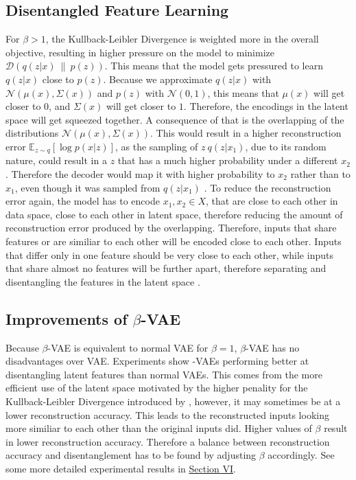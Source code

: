 \documentclass[a4paper]{IEEEtran}
\begin{document}
\subsection{Disentangled Feature Learning}
For $\beta > 1$, the Kullback-Leibler Divergence is weighted more in the overall objective, resulting in higher pressure on the model to minimize $\mathcal{D}(q(z|x) \ \| \ p(z))$. This means that the model gets pressured to learn $q(z|x)$ close to $p(z)$. Because we approximate $q(z|x)$ with $\mathcal{N}(\mu(x), \Sigma(x))$ and $p(z)$ with $\mathcal{N}(0, 1)$, this means that $\mu(x)$ will get closer to $0$, and $\Sigma(x)$ will get closer to $1$. Therefore, the encodings in the latent space will get squeezed together. A consequence of that is the overlapping of the distributions $\mathcal{N}(\mu(x), \Sigma(x))$. This would result in a higher reconstruction error $\mathbb{E}_{z \sim q}\left[ \log p(x|z) \right]$, as the sampling of $z ~ q(z|x_1)$, due to its random nature, could result in a $z$ that has a much higher probability under a different $x_2$. Therefore the decoder would map it with higher probability to $x_2$ rather than to $x_1$, even though it was sampled from $q(z|x_1)$ \cite{burgess2018understanding}. To reduce the reconstruction error again, the model has to encode $x_1, x_2 \in X$, that are close to each other in data space, close to each other in latent space, therefore reducing the amount of reconstruction error produced by the overlapping. Therefore, inputs that share features or are similiar to each other will be encoded close to each other. Inputs that differ only in one feature should be very close to each other, while inputs that share almost no features will be further apart, therefore separating and disentangling the features in the latent space \cite{burgess2018understanding}. 


\subsection{Improvements of $\beta$-VAE}
Because $\beta$-VAE is equivalent to normal VAE for $\beta = 1$, $\beta$-VAE has no disadvantages over VAE. Experiments show \textbeta -VAEs performing better at disentangling latent features than normal VAEs. This comes from the more efficient use of the latent space motivated by the higher penality for the Kullback-Leibler Divergence introduced by \textbeta, however, it may sometimes be at a lower reconstruction accuracy. This leads to the reconstructed inputs looking more similiar to each other than the original inputs did. Higher values of $\beta$ result in lower reconstruction accuracy. Therefore a balance between reconstruction accuracy and disentanglement has to be found by adjusting $\beta$ accordingly. See some more detailed experimental results in \hyperref[sec:experiments]{Section VI}.
\end{document}
